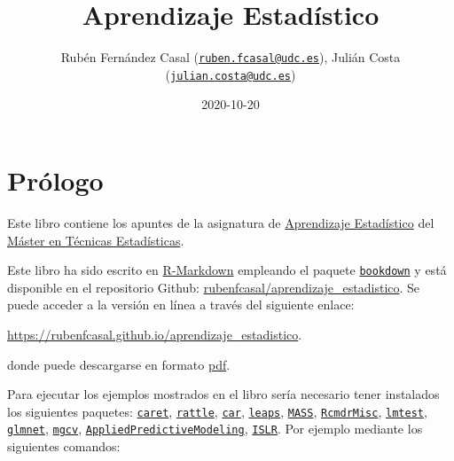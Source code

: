 \documentclass[]{book}
\title{Aprendizaje Estadístico}
\author{Rubén Fernández Casal
(\href{mailto:ruben.fcasal@udc.es}{\nolinkurl{ruben.fcasal@udc.es}}),
Julián Costa
(\href{mailto:julian.costa@udc.es}{\nolinkurl{julian.costa@udc.es}})}
\date{2020-10-20}
\theoremstyle{break}
\theoremstyle{definition}
\theoremstyle{definition}
\theoremstyle{definition}
\theoremstyle{remark}
\begin{document}
\maketitle

{
\setcounter{tocdepth}{1}
\tableofcontents
}
\chapter*{Prólogo}\label{pruxf3logo}

Este libro contiene los apuntes de la asignatura de
\href{http://eamo.usc.es/pub/mte/index.php?option=com_content\&view=article\&id=74}{Aprendizaje
Estadístico} del \href{http://eio.usc.es/pub/mte}{Máster en Técnicas
Estadísticas}.

Este libro ha sido escrito en
\href{http://rmarkdown.rstudio.com}{R-Markdown} empleando el paquete
\href{https://bookdown.org/yihui/bookdown/}{\texttt{bookdown}} y está
disponible en el repositorio Github:
\href{https://github.com/rubenfcasal/aprendizaje_estadistico}{rubenfcasal/aprendizaje\_estadistico}.
Se puede acceder a la versión en línea a través del siguiente enlace:

\url{https://rubenfcasal.github.io/aprendizaje_estadistico}.

donde puede descargarse en formato
\href{https://rubenfcasal.github.io/aprendizaje_estadistico/aprendizaje_estadistico.pdf}{pdf}.

Para ejecutar los ejemplos mostrados en el libro sería necesario tener
instalados los siguientes paquetes:
\href{https://CRAN.R-project.org/package=caret}{\texttt{caret}},
\href{https://CRAN.R-project.org/package=rattle}{\texttt{rattle}},
\href{https://CRAN.R-project.org/package=car}{\texttt{car}},
\href{https://CRAN.R-project.org/package=leaps}{\texttt{leaps}},
\href{https://CRAN.R-project.org/package=MASS}{\texttt{MASS}},
\href{https://CRAN.R-project.org/package=RcmdrMisc}{\texttt{RcmdrMisc}},
\href{https://CRAN.R-project.org/package=lmtest}{\texttt{lmtest}},
\href{https://CRAN.R-project.org/package=glmnet}{\texttt{glmnet}},
\href{https://CRAN.R-project.org/package=mgcv}{\texttt{mgcv}},
\href{https://CRAN.R-project.org/package=AppliedPredictiveModeling}{\texttt{AppliedPredictiveModeling}},
\href{https://CRAN.R-project.org/package=ISLR}{\texttt{ISLR}}. Por
ejemplo mediante los siguientes comandos:
\end{document}
